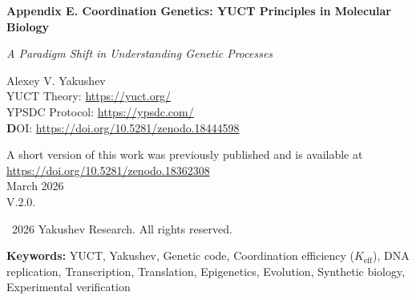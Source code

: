 \documentclass[12pt]{article}
\begin{document}
	
	\begin{titlepage}
		\begin{center}
			\vspace*{0cm}
			
			\Huge\textbf{Appendix E. Coordination Genetics: YUCT Principles in Molecular Biology}
			
			\vspace{1cm}
			
			\small\textit{A Paradigm Shift in Understanding Genetic Processes}
			
			\vspace{1cm}
			\Large
			Alexey V. Yakushev\\
			
	YUCT Theory: \url{https://yuct.org/}\\
YPSDC Protocol: \url{https://ypsdc.com/}\\


\vspace{2cm}
\textbf DOI: \url{https://doi.org/10.5281/zenodo.18444598}\\

\vspace{1cm}

\vspace{0cm}
\large 
A short version of this work was previously published and is available at\\ \url{https://doi.org/10.5281/zenodo.18362308}\\
\vspace{1cm}
March 2026 \\ \large V.2.0.
			
			\vspace{4cm}
			\textcopyright~2026 Yakushev Research. All rights reserved.
			
			\newpage	
			\begin{abstract}
				\noindent
				This work presents a fundamental rethinking of genetic processes through the lens of Yakushev's coordination principles. We demonstrate that the genetic code, DNA replication, gene expression, and evolution represent coordination processes with measurable efficiency $K_{\text{eff}}$. New mathematical models are introduced, predicting previously unexplained phenomena and opening pathways to programmable evolution. The theory provides testable predictions across multiple experimental domains, from simple laboratory tests to complex genetic engineering projects.
			\end{abstract}
			
			\vspace{0cm}
			
			\noindent
			\textbf{Keywords:} YUCT, Yakushev, Genetic code, Coordination efficiency ($K_{\text{eff}}$), DNA replication, Transcription, Translation, Epigenetics, Evolution, Synthetic biology,  Experimental verification
			
			\vspace{0.5cm}
			
		\end{center}
	\end{titlepage}
	
\end{document}

